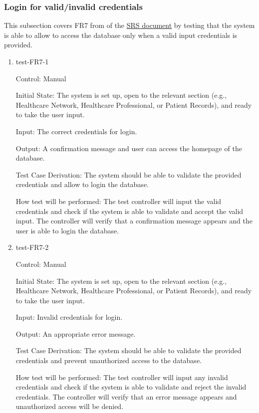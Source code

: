 \documentclass[12pt, titlepage]{article}
\begin{document}
\subsubsection{Login for valid/invalid credentials} \label{section:4.1.4}

This subsection covers FR7 from of the \href{https://github.com/Inreet-Kaur/capstone/blob/main/docs/SRS/SRS.pdf} {SRS document} by testing that the system is able to allow to access the database only when a valid input credentials is provided.

\begin{enumerate}

\item{test-FR7-1} \label{test-FR7-1}

Control: Manual

Initial State: The system is set up, open to the relevant section (e.g., Healthcare Network, Healthcare Professional, or Patient Records), and ready to take the user input.

Input: The correct credentials for login.

Output: A confirmation message and user can access the homepage of the database.

Test Case Derivation: The system should be able to validate the provided credentials and allow to login the database.

How test will be performed: The test controller will input the valid credentials and check if the system is able to validate and accept the valid input. The controller will verify that a confirmation message appears and the user is able to login the database.


\item{test-FR7-2} \label{test-FR7-2}

Control: Manual

Initial State: The system is set up, open to the relevant section (e.g., Healthcare Network, Healthcare Professional, or Patient Records), and ready to take the user input.

Input: Invalid credentials for login.

Output: An appropriate error message.

Test Case Derivation: The system should be able to validate the provided credentials and prevent unauthorized access to the database.

How test will be performed: The test controller will input any invalid credentials and check if the system is able to validate and reject the invalid credentials. The controller will verify that an error message appears and unauthorized access will be denied.

\end{enumerate}
\end{document}
